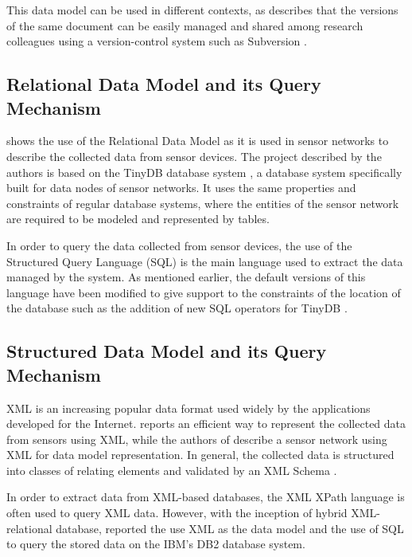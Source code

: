 This data model can be used in different contexts, as \cite{sn-provenance}
describes that the versions of the same document can be easily managed and
shared among research colleagues using a version-control system such as
Subversion \cite{subversion}.

\subsection{Relational Data Model and its Query Mechanism}

\cite{sn-db-newop} shows the use of the Relational Data Model
\cite{relational-model} as it is used in sensor networks to describe the
collected data from sensor devices. The project described
by the authors is based on the TinyDB database system \cite{sn-db-tinydb}, a
database system specifically built for data nodes of sensor networks. It uses
the same properties and constraints of regular database systems, where the
entities of the sensor network are required to be modeled and represented by
tables.

In order to query the data collected from sensor devices, the use of the 
Structured Query Language (SQL) \cite{sql} is the main language used to extract
the data managed by the system. As mentioned earlier, the default versions of
this language have been modified to give support to the constraints of the
location of the database such as the addition of new SQL operators for TinyDB
\cite{sn-db-newop}.

\subsection{Structured Data Model and its Query Mechanism}

XML is an increasing popular data format used widely by the applications developed
for the Internet. \cite{sn-xml-usage01} reports an efficient way to represent
the collected data from sensors using XML, while the authors of
\cite{sn-xml-usage02} describe a sensor network using XML for data model
representation. In general, the collected data is structured into classes of
relating elements and validated by an XML Schema \cite{xml-schema}.

In order to extract data from XML-based databases, the XML XPath language
\cite{xml-xpath} is often used to query XML data. However, with the inception
of hybrid XML-relational database, \cite{sn-xml-usage03} reported the use XML
as the data model and the use of SQL to query the stored data on the IBM's DB2
database system. 

